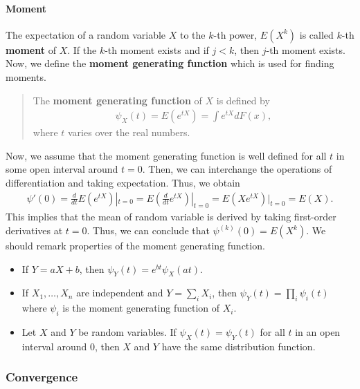 \documentclass[
  12pt,
]{article}
\providecommand{\tightlist}{%
  \setlength{\itemsep}{0pt}\setlength{\parskip}{0pt}}
\begin{document}
\hypertarget{moment}{%
\paragraph{Moment}\label{moment}}

The expectation of a random variable \(X\) to the \(k\)-th power, \(E(X^k)\) is called \(k\)-th \textbf{moment} of \(X\).
If the \(k\)-th moment exists and if \(j < k\), then \(j\)-th moment exists.
Now, we define the \textbf{moment generating function} which is used for finding moments.

\begin{quote}
The \textbf{moment generating function} of \(X\) is defined by
\begin{align*}
\psi_X(t) = E(e^{tX}) = \int e^{tX} dF(x),
\end{align*}
where \(t\) varies over the real numbers.
\end{quote}

Now, we assume that the moment generating function is well defined for all \(t\) in some open interval around \(t = 0\).
Then, we can interchange the operations of differentiation and taking expectation.
Thus, we obtain
\begin{align*}
  \psi'(0) 
  = \frac{d}{dt} E(e^{tX})|_{t = 0} 
  = E \left( \frac{d}{dt} e^{tX} \right) |_{t = 0}
  = E (X e^{tX})|_{t = 0} 
  = E(X).
\end{align*}
This implies that the mean of random variable is derived by taking first-order derivatives at \(t = 0\).
Thus, we can conclude that \(\psi^{(k)}(0) = E(X^k)\).
We should remark properties of the moment generating function.

\begin{itemize}
\tightlist
\item
  If \(Y = a X + b\), then \(\psi_Y(t) = e^{bt} \psi_X(at)\).
\item
  If \(X_1, \ldots, X_n\) are independent and \(Y = \sum_i X_i\), then \(\psi_Y(t) = \prod_i \psi_i (t)\) where \(\psi_i\) is the moment generating function of \(X_i\).
\item
  Let \(X\) and \(Y\) be random variables. If \(\psi_X(t) = \psi_Y(t)\) for all \(t\) in an open interval around 0, then \(X\) and \(Y\) have the same distribution function.
\end{itemize}

\hypertarget{convergence}{%
\subsubsection{Convergence}\label{convergence}}
\end{document}
